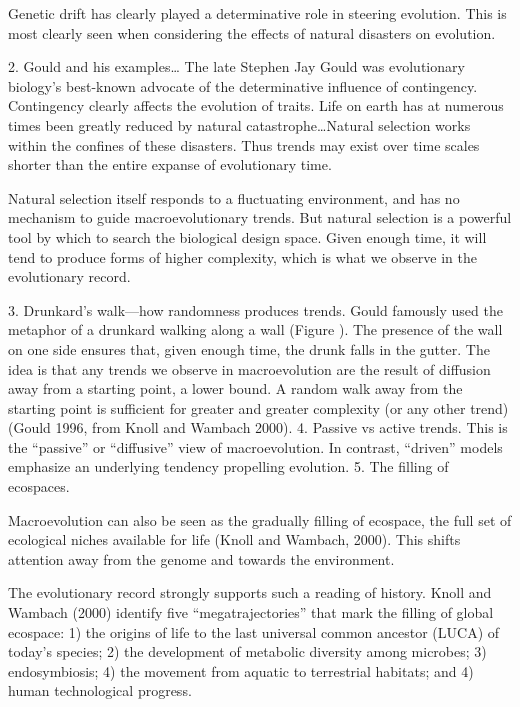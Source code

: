 \documentclass{tufte-book} %
\begin{document}
Genetic drift has clearly played a determinative role in steering evolution. This is most clearly seen when considering the effects of natural disasters on evolution. 


2. Gould and his examples…
The late Stephen Jay Gould was evolutionary biology’s best-known advocate of the determinative influence of contingency. 
Contingency clearly affects the evolution of traits. Life on earth has at numerous times been greatly reduced by natural catastrophe…Natural selection works within the confines of these disasters. Thus trends may exist over time scales shorter than the entire expanse of evolutionary time. 



 Natural selection itself responds to a fluctuating environment, and has no mechanism to guide macroevolutionary trends. But natural selection is a powerful tool by which to search the biological design space. Given enough time, it will tend to produce forms of higher complexity, which is what we observe in the evolutionary record. 
 
3. Drunkard’s walk—how randomness produces trends. 
Gould famously used the metaphor of a drunkard walking along a wall (Figure ). The presence of the wall on one side ensures that, given enough time, the drunk falls in the gutter. The idea is that any trends we observe in macroevolution are the result of diffusion away from a starting point, a lower bound. A random walk away from the starting point is sufficient for greater and greater complexity (or any other trend) (Gould 1996, from Knoll and Wambach 2000). 
4. Passive vs active trends.
This is the “passive” or “diffusive” view of macroevolution. 
In contrast, “driven” models emphasize an underlying tendency propelling evolution. 
5. The filling of ecospaces.

Macroevolution can also be seen as the gradually filling of ecospace, the full set of ecological niches available for life (Knoll and Wambach, 2000). This shifts attention away from the genome and towards the environment. 

The evolutionary record strongly supports such a reading of history. Knoll and Wambach (2000) identify five “megatrajectories” that mark the filling of global ecospace: 1) the origins of life to the last universal common ancestor (LUCA) of today’s species; 2) the development of metabolic diversity among microbes; 3) endosymbiosis; 4) the movement from aquatic to terrestrial habitats; and 4) human technological progress. 
\end{document}
